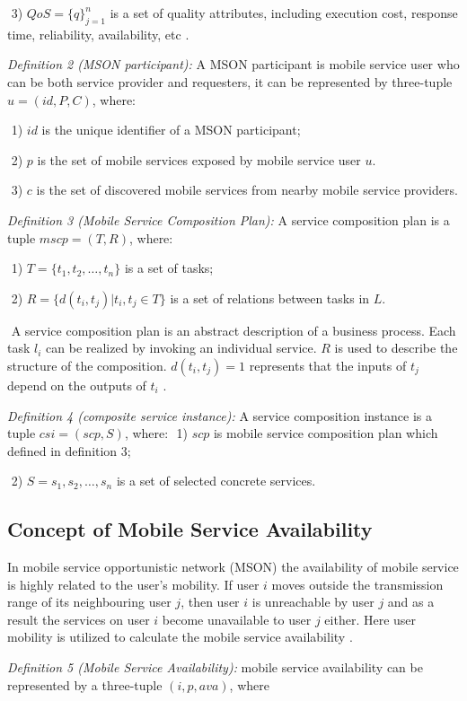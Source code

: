 \documentclass[10pt,journal,compsoc]{IEEEtran}
\begin{document}
​	3) $QoS = \{q\}^n_{j=1}$ is a set of quality attributes, including execution cost, response time, reliability, availability, etc \cite{Deng2016-2}.

\textit{Definition 2 (MSON participant):} A MSON participant is mobile service user who can be both service provider and requesters, it can be represented by three-tuple $u = (id, P, C)$, where:

​	1) $id$ is the unique identifier of a MSON participant;

​	2) $p$ is the set of mobile services exposed by mobile service user $u$.

​	3) $c$ is the set of discovered mobile services from nearby mobile service providers.

\textit{Definition 3 (Mobile Service Composition Plan):} A service composition plan is a tuple $mscp = (T, R)$, where:

​	1) $T = \{t_1,t_2,…,t_n\}$ is a set of tasks;

​	2) $R = \{d(t_i,t_j)|t_i,t_j \in T\}$ is a set of relations between tasks in $L$.

​	A service composition plan is an abstract description of a business process. Each task $l_i$ can be realized by invoking an individual service. $R$ is used to describe the structure of the composition. $d(t_i, t_j) = 1$ represents that the inputs of $t_j$ depend on the outputs of $t_i$ \cite{Deng2016-2}.

\textit{Definition 4 (composite service instance):} A service composition instance is a tuple $csi = (scp, S)$, where:
​	1) $scp$ is mobile service composition plan which defined in definition 3;

​	2) $S = {s_1, s_2,…,s_n}$ is a set of selected concrete services.

\subsection{Concept of Mobile Service Availability}
In mobile service opportunistic network (MSON) the availability of mobile service is highly related to the user’s mobility. If user $i$ moves outside the transmission range of its neighbouring user $j$, then user $i$ is unreachable by user $j$ and as a result the services on user $i$ become unavailable to user $j$ either. Here user mobility is utilized to calculate the mobile service availability \cite{Yang2010}.

\textit{Definition 5 (Mobile Service Availability):} mobile service availability can be represented by a three-tuple $(i, p, ava) $, where
\end{document}

